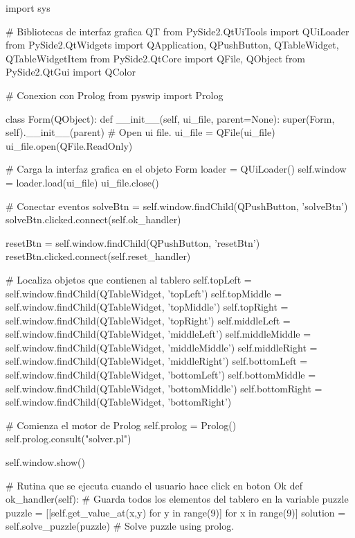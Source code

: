\documentclass[10pt,a4paper]{article}
\begin{document}
\begin{python}
import sys

# Bibliotecas de interfaz grafica QT
from PySide2.QtUiTools import QUiLoader
from PySide2.QtWidgets import QApplication, QPushButton, QTableWidget, QTableWidgetItem
from PySide2.QtCore import QFile, QObject
from PySide2.QtGui import QColor

# Conexion con Prolog
from pyswip import Prolog

class Form(QObject):
    def __init__(self, ui_file, parent=None):
        super(Form, self).__init__(parent)
        # Open ui file.
        ui_file = QFile(ui_file)
        ui_file.open(QFile.ReadOnly)

        # Carga la interfaz grafica en el objeto Form
        loader = QUiLoader()
        self.window = loader.load(ui_file)
        ui_file.close()

        # Conectar eventos
        solveBtn = self.window.findChild(QPushButton, 'solveBtn')
        solveBtn.clicked.connect(self.ok_handler)

        resetBtn = self.window.findChild(QPushButton, 'resetBtn')
        resetBtn.clicked.connect(self.reset_handler)

        # Localiza objetos que contienen al tablero
        self.topLeft = self.window.findChild(QTableWidget, 'topLeft')
        self.topMiddle = self.window.findChild(QTableWidget, 'topMiddle')
        self.topRight = self.window.findChild(QTableWidget, 'topRight')
        self.middleLeft = self.window.findChild(QTableWidget, 'middleLeft')
        self.middleMiddle = self.window.findChild(QTableWidget, 'middleMiddle')
        self.middleRight = self.window.findChild(QTableWidget, 'middleRight')
        self.bottomLeft = self.window.findChild(QTableWidget, 'bottomLeft')
        self.bottomMiddle = self.window.findChild(QTableWidget, 'bottomMiddle')
        self.bottomRight = self.window.findChild(QTableWidget, 'bottomRight')

        # Comienza el motor de Prolog
        self.prolog = Prolog()
        self.prolog.consult("solver.pl")

        self.window.show()

    # Rutina que se ejecuta cuando el usuario hace click en boton Ok
    def ok_handler(self):
    	# Guarda todos los elementos del tablero en la variable puzzle
        puzzle = [[self.get_value_at(x,y) for y in range(9)] for x in range(9)]
        solution = self.solve_puzzle(puzzle) # Solve puzzle using prolog.


\end{python}
\end{document}
